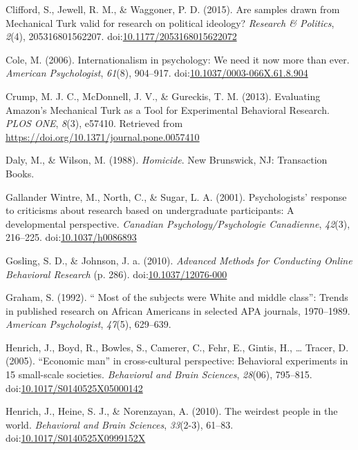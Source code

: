 \documentclass[english,man]{apa6}
\theoremstyle{definition}
\theoremstyle{definition}
\theoremstyle{remark}
\begin{document}
\hypertarget{ref-Clifford2015}{}
Clifford, S., Jewell, R. M., \& Waggoner, P. D. (2015). Are samples
drawn from Mechanical Turk valid for research on political ideology?
\emph{Research \& Politics}, \emph{2}(4), 205316801562207.
doi:\href{https://doi.org/10.1177/2053168015622072}{10.1177/2053168015622072}

\hypertarget{ref-Cole2006}{}
Cole, M. (2006). Internationalism in psychology: We need it now more
than ever. \emph{American Psychologist}, \emph{61}(8), 904--917.
doi:\href{https://doi.org/10.1037/0003-066X.61.8.904}{10.1037/0003-066X.61.8.904}

\hypertarget{ref-Crump2013}{}
Crump, M. J. C., McDonnell, J. V., \& Gureckis, T. M. (2013). Evaluating
Amazon's Mechanical Turk as a Tool for Experimental Behavioral Research.
\emph{PLOS ONE}, \emph{8}(3), e57410. Retrieved from
\url{https://doi.org/10.1371/journal.pone.0057410}

\hypertarget{ref-Daly1988}{}
Daly, M., \& Wilson, M. (1988). \emph{Homicide}. New Brunswick, NJ:
Transaction Books.

\hypertarget{ref-Gallander2001}{}
Gallander Wintre, M., North, C., \& Sugar, L. A. (2001). Psychologists'
response to criticisms about research based on undergraduate
participants: A developmental perspective. \emph{Canadian
Psychology/Psychologie Canadienne}, \emph{42}(3), 216--225.
doi:\href{https://doi.org/10.1037/h0086893}{10.1037/h0086893}

\hypertarget{ref-Gosling2010a}{}
Gosling, S. D., \& Johnson, J. a. (2010). \emph{Advanced Methods for
Conducting Online Behavioral Research} (p. 286).
doi:\href{https://doi.org/10.1037/12076-000}{10.1037/12076-000}

\hypertarget{ref-Graham1992}{}
Graham, S. (1992). `` Most of the subjects were White and middle
class'': Trends in published research on African Americans in selected
APA journals, 1970--1989. \emph{American Psychologist}, \emph{47}(5),
629--639.

\hypertarget{ref-Henrich2005}{}
Henrich, J., Boyd, R., Bowles, S., Camerer, C., Fehr, E., Gintis, H.,
\ldots{} Tracer, D. (2005). ``Economic man'' in cross-cultural
perspective: Behavioral experiments in 15 small-scale societies.
\emph{Behavioral and Brain Sciences}, \emph{28}(06), 795--815.
doi:\href{https://doi.org/10.1017/S0140525X05000142}{10.1017/S0140525X05000142}

\hypertarget{ref-Henrich2010}{}
Henrich, J., Heine, S. J., \& Norenzayan, A. (2010). The weirdest people
in the world. \emph{Behavioral and Brain Sciences}, \emph{33}(2-3),
61--83.
doi:\href{https://doi.org/10.1017/S0140525X0999152X}{10.1017/S0140525X0999152X}
\end{document}
